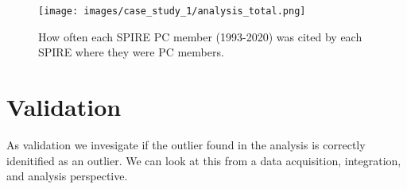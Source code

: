 \documentclass{ou-report}
\newcommand{\outline}[1]{{\color{blue} #1}}
\begin{document}
\begin{figure}[H]
    \centering
    \texttt{[image: images/case\_study\_1/analysis\_total.png]}
    \caption{How often each SPIRE PC member (1993-2020) was cited by each SPIRE where they were PC members.}
    \label{fig:analysis_members}
\end{figure}








\section{Validation}
As validation we invesigate if the outlier found in the analysis is correctly 
idenitified as an outlier. We can look at this from a data acquisition,
integration, and analysis perspective.
\end{document}
